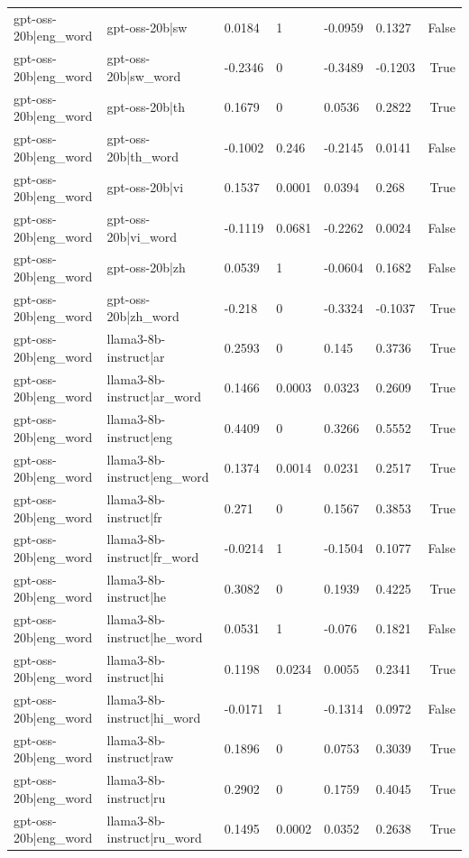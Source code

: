 \begin{table}
\begin{tabular}{llllllr}
gpt-oss-20b|eng_word & gpt-oss-20b|sw & 0.0184 & 1 & -0.0959 & 0.1327 & False \\
gpt-oss-20b|eng_word & gpt-oss-20b|sw_word & -0.2346 & 0 & -0.3489 & -0.1203 & True \\
gpt-oss-20b|eng_word & gpt-oss-20b|th & 0.1679 & 0 & 0.0536 & 0.2822 & True \\
gpt-oss-20b|eng_word & gpt-oss-20b|th_word & -0.1002 & 0.246 & -0.2145 & 0.0141 & False \\
gpt-oss-20b|eng_word & gpt-oss-20b|vi & 0.1537 & 0.0001 & 0.0394 & 0.268 & True \\
gpt-oss-20b|eng_word & gpt-oss-20b|vi_word & -0.1119 & 0.0681 & -0.2262 & 0.0024 & False \\
gpt-oss-20b|eng_word & gpt-oss-20b|zh & 0.0539 & 1 & -0.0604 & 0.1682 & False \\
gpt-oss-20b|eng_word & gpt-oss-20b|zh_word & -0.218 & 0 & -0.3324 & -0.1037 & True \\
gpt-oss-20b|eng_word & llama3-8b-instruct|ar & 0.2593 & 0 & 0.145 & 0.3736 & True \\
gpt-oss-20b|eng_word & llama3-8b-instruct|ar_word & 0.1466 & 0.0003 & 0.0323 & 0.2609 & True \\
gpt-oss-20b|eng_word & llama3-8b-instruct|eng & 0.4409 & 0 & 0.3266 & 0.5552 & True \\
gpt-oss-20b|eng_word & llama3-8b-instruct|eng_word & 0.1374 & 0.0014 & 0.0231 & 0.2517 & True \\
gpt-oss-20b|eng_word & llama3-8b-instruct|fr & 0.271 & 0 & 0.1567 & 0.3853 & True \\
gpt-oss-20b|eng_word & llama3-8b-instruct|fr_word & -0.0214 & 1 & -0.1504 & 0.1077 & False \\
gpt-oss-20b|eng_word & llama3-8b-instruct|he & 0.3082 & 0 & 0.1939 & 0.4225 & True \\
gpt-oss-20b|eng_word & llama3-8b-instruct|he_word & 0.0531 & 1 & -0.076 & 0.1821 & False \\
gpt-oss-20b|eng_word & llama3-8b-instruct|hi & 0.1198 & 0.0234 & 0.0055 & 0.2341 & True \\
gpt-oss-20b|eng_word & llama3-8b-instruct|hi_word & -0.0171 & 1 & -0.1314 & 0.0972 & False \\
gpt-oss-20b|eng_word & llama3-8b-instruct|raw & 0.1896 & 0 & 0.0753 & 0.3039 & True \\
gpt-oss-20b|eng_word & llama3-8b-instruct|ru & 0.2902 & 0 & 0.1759 & 0.4045 & True \\
gpt-oss-20b|eng_word & llama3-8b-instruct|ru_word & 0.1495 & 0.0002 & 0.0352 & 0.2638 & True \\

\end{tabular}
\end{table}
